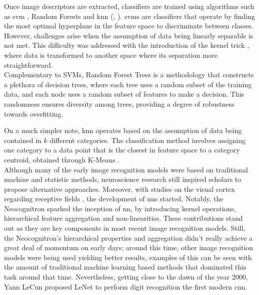 \noindent Once image descriptors are extracted, classifiers are trained using algorithms such as 
\gls{svm} \autocite{cortes1995support}, Random Forests \autocite{ho1995random} and \gls{knn}
(\cite{cover1967nearest}, \cite{fix1989discriminatory}). \glspl{svm} are classifiers that operate 
by finding the most optimal hyperplane in the feature space to discriminate between classes. 
However, challenges arise when the assumption of data being linearly separable is not met. This 
difficulty was addressed with the introduction of the kernel trick \autocite{hofmann2008kernel}, 
where data is transformed to another space where its separation more straightforward.\\
Complementary to SVMs, Random Forest Trees is a methodology that constructs a plethora of decision 
trees, where each tree uses a random subset of the training data, and each node uses a random 
subset of features to make a decision. This randomness ensures diversity among trees, providing a 
degree of robustness towards overfitting.

On a much simpler note, \gls{knn} operates based on the assumption of data being contained in 
$k$ different categories. The classification method involves assigning one category to a data 
point that is the closest in feature space to a category centroid, obtained through K-Means 
\autocite{macqueen1967some}.\\

\noindent Although many of the early image recognition models were based on traditional machine 
and statistic methods, neuroscience research still inspired scholars to propose alternative 
approaches. Moreover, with studies on the visual cortex regarding receptive fields 
\autocite{hubel1959receptive}, the development of \glspl{nn} started. Notably, the 
Neocognitron \autocite{fukushima1975cognitron} sparked the inception of  \gls{nn}, by introducing 
kernel operations, hierarchical feature aggregation and non-linearities. These contributions stand 
out as they are key components in most recent image recognition models.
Still, the Neocognitron's hierarchical properties and aggregation didn't really achieve 
a great deal of momentum on early days; around this time, other image recognition models were being 
used yielding better results, examples of this can be seen with the amount of traditional machine 
learning based methods that dominated this task around that time. Nevertheless, getting close to the 
dawn of the year 2000, Yann LeCun proposed LeNet to perform digit recognition 
\autocite{lecun1998gradient} the first modern \gls{cnn}.\\

